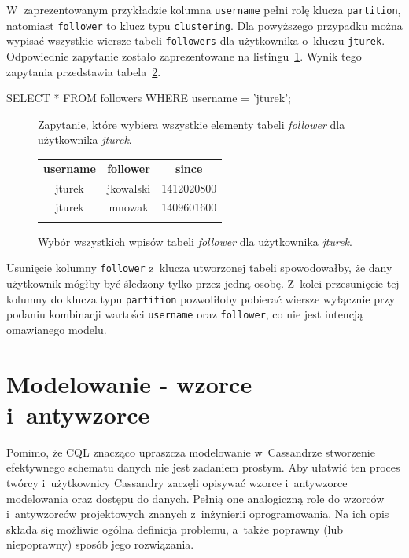 W~zaprezentowanym przykładzie kolumna \verb+username+ pełni rolę klucza \verb+partition+, natomiast \verb+follower+ to klucz typu \verb+clustering+. Dla powyższego przypadku można wypisać wszystkie wiersze tabeli \verb+followers+ dla użytkownika o~kluczu \verb+jturek+. Odpowiednie zapytanie zostało zaprezentowane na listingu~\ref{lst:all_jturek_followers}. Wynik tego zapytania przedstawia tabela~\ref{tab:all_jturek_followers}.

\begin{verbbox}
	SELECT * FROM followers WHERE username = 'jturek';
\end{verbbox}

\begin{figure}[ht!]
	\centering
	\theverbbox
	\caption{Zapytanie, które wybiera wszystkie elementy tabeli \emph{follower} dla użytkownika \emph{jturek}.}
	\label{lst:all_jturek_followers}
\end{figure}

\begin{figure}[ht!]
	\centering
	\begin{tabular}{|c|c|c|}
		\hhline{|---|}
		\textbf{username} & \textbf{follower} & \textbf{since} \\
		\hhline{|===|}
		jturek & jkowalski & 1412020800 \\
		jturek & mnowak & 1409601600 \\
		\hhline{|---|}
	\end{tabular} 

	\caption{Wybór wszystkich wpisów tabeli \emph{follower} dla użytkownika \emph{jturek}.}
	\label{tab:all_jturek_followers}
\end{figure}

Usunięcie kolumny \verb+follower+ z~klucza utworzonej tabeli spowodowałby, że dany użytkownik mógłby być śledzony tylko przez jedną osobę. Z~kolei przesunięcie tej kolumny do klucza typu \verb+partition+ pozwoliłoby pobierać wiersze wyłącznie przy podaniu kombinacji wartości \verb+username+ oraz \verb+follower+, co nie jest intencją omawianego modelu.

\section{Modelowanie - wzorce i~antywzorce}
\label{sec:patterns_and_antipatterns}

Pomimo, że CQL znacząco upraszcza modelowanie w~Cassandrze stworzenie efektywnego schematu danych nie jest zadaniem prostym. Aby ułatwić ten proces twórcy i~użytkownicy Cassandry zaczęli opisywać wzorce i~antywzorce modelowania oraz dostępu do danych. Pełnią one analogiczną role do wzorców i~antywzorców projektowych znanych z~inżynierii oprogramowania. Na ich opis składa się możliwie ogólna definicja problemu, a~także poprawny (lub niepoprawny) sposób jego rozwiązania. 

